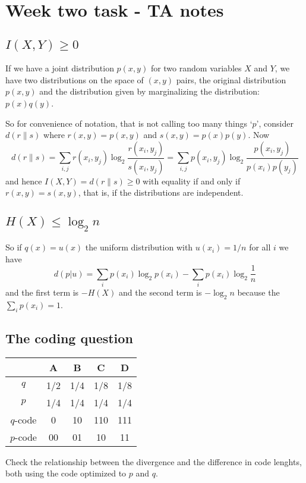 \documentclass[12pt]{article}
\begin{document}
\section*{Week two task - TA notes} 

\subsection*{$I(X,Y)\ge 0$}

If we have a joint distribution $p(x,y)$ for two random variables $X$
and $Y$, we have two distributions on the space of $(x,y)$ pairs, the
original distribution $p(x,y)$ and the distribution given by
marginalizing the distribution: $p(x)q(y)$.

So for convenience
of notation, that is not calling too many things `$p$', consider
$d(r\|s)$ where $r(x,y)=p(x,y)$ and $s(x,y)=p(x)p(y)$. Now
\begin{equation}
 d(r\|s) = \sum_{i,j} r(x_i,y_j)\log_2{\frac{r(x_i,y_j)}{s(x_i,y_j)}}=\sum_{i,j} p(x_i,y_j)\log_2{\frac{p(x_i,y_j)}{p(x_i)p(y_j)}}
 \end{equation}
and hence $I(X,Y)=d(r\|s)\ge 0$ with equality if and only if
$r(x,y)=s(x,y)$, that is, if the distributions are independent.

\subsection*{$H(X)\le \log_2{n}$}

So if $q(x)=u(x)$ the uniform distribution with $u(x_i)=1/n$ for all $i$ we have
\begin{equation}
  d(p|u)=\sum_i p(x_i)\log_2{p(x_i)}-\sum_i p(x_i)\log_2 \frac{1}{n}
\end{equation}
and the first term is $-H(X)$ and the second term is $-\log_2{n}$ because the $\sum_i p(x_i)=1$.

\subsection*{The coding question}

\begin{center}
\begin{tabular}{c|cccc}
&{A}&{B}&{C}&{D}\\
\hline
$q$&1/2&1/4&1/8&1/8\\
$p$&1/4&1/4&1/4&1/4\\
\hline
$q$-code&{0}&{10}&{110}&{111}\\
$p$-code&{00}&{01}&{10}&{11}
\end{tabular}
\end{center}
 Check the relationship between the divergence and the
difference in code lenghts, both using the code optimized to
$p${} and $q${}.  
\end{document}
